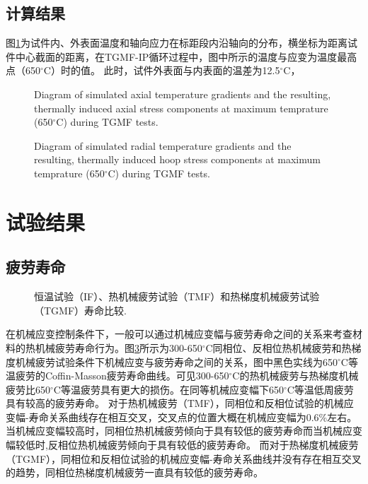 \subsection{计算结果}
图\ref{Fig:plot_temperature_along_gauge_length}为试件内、外表面温度和轴向应力在标距段内沿轴向的分布，横坐标为距离试件中心截面的距离，在TGMF-IP循环过程中，图中所示的温度与应变为温度最高点（650$^{\circ}$C）时的值。
此时，试件外表面与内表面的温差为12.5$^{\circ}$C，


\begin{figure}[!htp]
\caption{Diagram of simulated axial temperature gradients and the resulting, thermally induced axial stress components at maximum temprature (650$^{\circ}$C) during TGMF tests.}
\label{Fig:plot_temperature_along_gauge_length}
\end{figure}


\begin{figure}[!htp]
\caption{Diagram of simulated radial temperature gradients and the resulting, thermally induced hoop stress components at maximum temprature (650$^{\circ}$C) during TGMF tests.}
\label{Fig:plot_temperature_along_radial_direction}
\end{figure}

\section{试验结果}
\subsection{疲劳寿命}

\begin{figure}[!htp]
\caption{恒温试验（IF）、热机械疲劳试验（TMF）和热梯度机械疲劳试验（TGMF）寿命比较.}
\label{Fig:plot_exp_fatigue_life}
\end{figure}

在机械应变控制条件下，一般可以通过机械应变幅与疲劳寿命之间的关系来考查材料的热机械疲劳寿命行为。图\ref{Fig:plot_exp_fatigue_life}所示为300-650$^{\circ}$C同相位、反相位热机械疲劳和热梯度机械疲劳试验条件下机械应变与疲劳寿命之间的关系，图中黑色实线为650$^{\circ}$C等温疲劳的Coffin-Masson疲劳寿命曲线。可见300-650$^{\circ}$C的热机械疲劳与热梯度机械疲劳比650$^{\circ}$C等温疲劳具有更大的损伤。在同等机械应变幅下650$^{\circ}$C等温低周疲劳具有较高的疲劳寿命。
对于热机械疲劳（TMF），同相位和反相位试验的机械应变幅-寿命关系曲线存在相互交叉，交叉点的位置大概在机械应变幅为0.6\%左右。
当机械应变幅较高时，同相位热机械疲劳倾向于具有较低的疲劳寿命而当机械应变幅较低时,反相位热机械疲劳倾向于具有较低的疲劳寿命。
而对于热梯度机械疲劳（TGMF），同相位和反相位试验的机械应变幅-寿命关系曲线并没有存在相互交叉的趋势，同相位热梯度机械疲劳一直具有较低的疲劳寿命。


